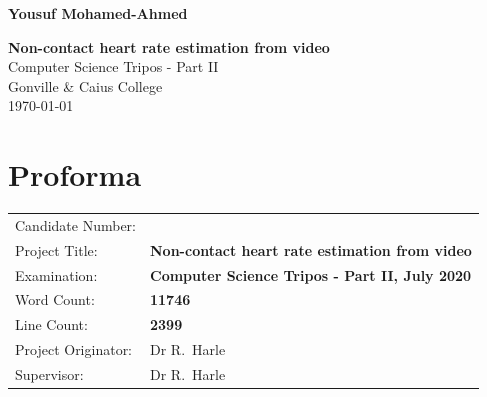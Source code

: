 \documentclass[12pt,twoside,notitlepage]{report}
\begin{document}





\pagestyle{empty}

\hfill{\LARGE \bf Yousuf Mohamed-Ahmed}

\vspace*{60mm}
\begin{center}
\Huge
{\bf Non-contact heart rate estimation from video} \\
\vspace*{5mm}
Computer Science Tripos - Part II  \\
\vspace*{5mm}
Gonville \& Caius College\\
\vspace*{5mm}
\today  %
\end{center}

\cleardoublepage


\setcounter{page}{1}
\pagestyle{plain}

\chapter*{Proforma}

{\large
\begin{tabular}{ll}
Candidate Number:  & \\
Project Title:      & \bf Non-contact heart rate estimation from video \\
Examination:        & \bf Computer Science Tripos - Part II, July 2020    \\
Word Count:         & \bf 11746\footnotemark[1] \\
Line Count: & \bf 2399 \\
Project Originator: & Dr R.~Harle                    \\
Supervisor:         & Dr R.~Harle                    \\ 
\end{tabular}
}
\end{document}
